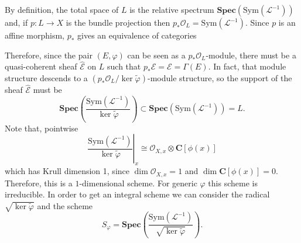 \documentclass[12pt,a4paper]{book}
\theoremstyle{definition} \newtheorem{defn}[thm]{Definition}
\theoremstyle{definition} \newtheorem{ejemplo}[thm]{Example}
\theoremstyle{remark} \newtheorem{rem}[thm]{Remark}
\def\OO{\mathscr{O}}
\def\LL{\mathscr{L}}
\def\EE{\mathscr{E}}
\def\CC{\mathbf{C}}
\def\Sym{\mathrm{Sym}}
\def\RSpec{\mathbf{Spec}}
\begin{document}
		By definition, the total space of $L$ is the relative spectrum $\RSpec(\Sym(\LL^{-1}))$ and, if $p:L\rightarrow X$ is the bundle projection then $p_*\OO_L=\Sym(\LL^{-1})$. Since $p$ is an affine morphism, $p_*$ gives an equivalence of categories
  \begin{center}
  \end{center}
  Therefore, since the pair $(E,\varphi)$ can be seen as a $p_*\OO_L$-module, there must be a quasi-coherent sheaf $\hat{\EE}$ on $L$ such that $p_*\hat{\EE}=\EE=\Gamma(E)$. In fact, that module structure descends to a $(p_*\OO_L/\ker \tilde{\varphi})$-module structure, so the support of the sheaf $\hat{\EE}$ must be 
  \begin{equation*}
     \RSpec\left( \frac{\Sym(\LL^{-1})}{\ker \tilde{\varphi}} \right)\subset \RSpec(\Sym(\LL^{-1}))=L.
  \end{equation*}
  Note that, pointwise
  \begin{equation*}
   \left.  \frac{\Sym(\LL^{-1})}{\ker \tilde{\varphi}}\right|_x \cong \OO_{X,x} \otimes \CC[\phi(x)]
  \end{equation*}
  which has Krull dimension 1, since $\dim \OO_{X,x}=1$ and $\dim \CC[\phi(x)]=0$. Therefore, this is a $1$-dimensional scheme. For generic $\varphi$ this scheme is irreducible. In order to get an integral scheme we can consider the radical $\sqrt{\ker \tilde{\varphi}}$ and the scheme
  \begin{equation*}
    S_\varphi= \RSpec\left( \frac{\Sym(\LL^{-1})}{\sqrt{\ker \tilde{\varphi}}} \right).
  \end{equation*}
\end{document}
